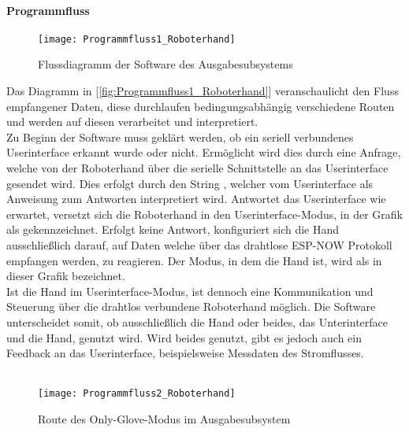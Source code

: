 \documentclass[titlepage,12pt,twoside]{article}
\begin{document}
\paragraph{Programmfluss}
\hfill \break
\hfill \break
\begin{figure}[H]
	\begin{center}
		\scalebox{1.2}
		{\texttt{[image: Programmfluss1\_Roboterhand]}}
		\caption{Flussdiagramm der Software des Ausgabesubsystems}
		\label{fig:Programmfluss1_Roboterhand}		
	\end{center}
\end{figure}
\hfill \break
Das Diagramm in [\textcolor{blue}{\autoref{fig:Programmfluss1_Roboterhand}}] veranschaulicht den Fluss empfangener Daten, diese durchlaufen bedingungsabhängig verschiedene Routen und 
werden auf diesen verarbeitet und interpretiert.
\\
Zu Beginn der Software muss geklärt werden, ob ein seriell verbundenes Userinterface erkannt wurde oder nicht. Ermöglicht wird dies durch eine Anfrage, 
welche von der Roboterhand über die serielle Schnittstelle an das Userinterface gesendet wird. Dies erfolgt durch den String , welcher vom Userinterface als Anweisung zum Antworten 
interpretiert wird. Antwortet das Userinterface wie erwartet, versetzt sich die Roboterhand in den Userinterface-Modus, in der Grafik als  
gekennzeichnet. Erfolgt keine Antwort, konfiguriert sich die Hand ausschließlich darauf, auf Daten welche über das drahtlose ESP-NOW Protokoll empfangen 
werden, zu reagieren. Der Modus, in dem die Hand ist, wird als  in dieser Grafik bezeichnet. \\
Ist die Hand im Userinterface-Modus, ist dennoch eine Kommunikation und Steuerung über die drahtlos verbundene Roboterhand möglich. Die Software 
unterscheidet somit, ob ausschließlich die Hand oder beides, das Unterinterface und die Hand, genutzt wird. Wird beides genutzt, gibt es jedoch auch ein 
Feedback an das Userinterface, beispielsweise Messdaten des Stromflusses. \\
\\
\begin{figure}[H]
	\begin{center}
		\scalebox{0.4}
		{\texttt{[image: Programmfluss2\_Roboterhand]}}
		\caption{Route des Only-Glove-Modus im Ausgabesubsystem}
		\label{fig:Programmfluss2_Roboterhand}		
	\end{center}
\end{figure}
\end{document}
